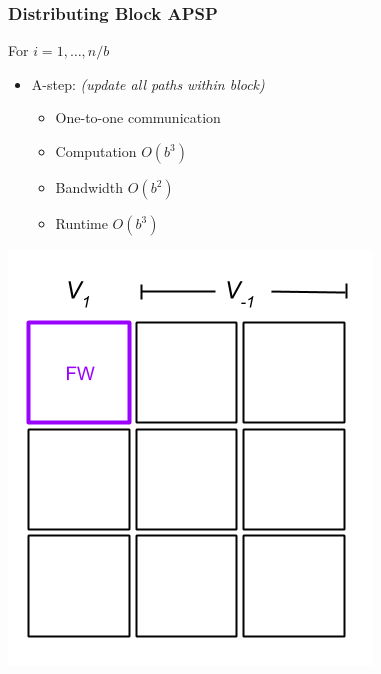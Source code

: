 \documentclass{beamer}
\begin{document}
\begin{frame}
\frametitle{Distributing Block APSP}
For $i = 1,\hdots, n/b$
\begin{itemize}
\item A-step: \emph{(update all paths within block)}
\begin{itemize}
\item One-to-one communication
\item Computation $O(b^3)$
\item Bandwidth $O(b^2)$
\item Runtime $O(b^3)$
\end{itemize} 
\end{itemize}
\begin{center}
\includegraphics[scale = 0.3]{blockApsp-2.png}
\end{center}
\end{frame}
\end{document}
